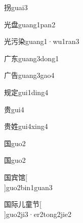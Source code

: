 \begin{verbete}[8]{拐}{guai3}
\end{verbete}

\begin{verbete}[6;11]{光盘}{guang1pan2}
\end{verbete}

\begin{verbete}[6;6;9]{光污染}{guang1·wu1ran3}
\end{verbete}

\begin{verbete*}[3;5]{广东}{guang3dong1}
\end{verbete*}

\begin{verbete}[3;7]{广告}{guang3gao4}
\end{verbete}

\begin{verbete}[8;8]{规定}{gui1ding4}
\end{verbete}

\begin{verbete}[9]{贵}{gui4}
\end{verbete}

\begin{verbete}[9;8]{贵姓}{gui4xing4}
\end{verbete}

\begin{verbete}[8]{国}{guo2}
\end{verbete}
\begin{verbete*}[8]{国}{guo2}
\end{verbete*}

\begin{verbete}[8;10;11]{国宾馆}[\\]{guo2bin1guan3}
\end{verbete}

\begin{verbete*}[8;7;2;12;5]{国际儿童节}[\\]{guo2ji3·er2tong2jie2}
\end{verbete*}

